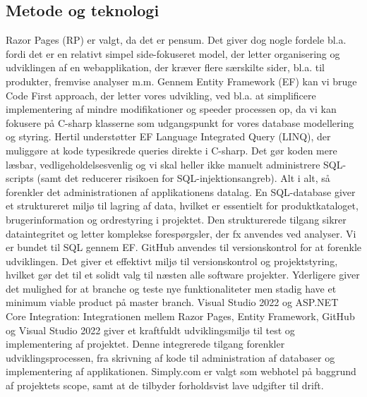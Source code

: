 \subsection{Metode og teknologi}
Razor Pages (RP) er valgt, da det er pensum. 
Det giver dog nogle fordele bl.a. fordi det er en relativt simpel side-fokuseret model, der letter organisering og udviklingen af en webapplikation, der kræver flere særskilte sider, bl.a. til produkter, fremvise analyser m.m. 
Gennem Entity Framework (EF) kan vi bruge Code First approach, der letter vores udvikling, ved bl.a. at simplificere implementering af mindre modifikationer og speeder processen op, 
da vi kan fokusere på C-sharp klasserne som udgangspunkt for vores database modellering og styring. Hertil understøtter EF Language Integrated Query (LINQ), der muliggøre at kode typesikrede queries direkte i C-sharp. 
Det gør koden mere læsbar, vedligeholdelsesvenlig og vi skal heller ikke manuelt administrere SQL-scripts (samt det reducerer risikoen for SQL-injektionsangreb). 
Alt i alt, så forenkler det administrationen af applikationens datalag. En SQL-database giver et struktureret miljø til lagring af data, hvilket er essentielt for produktkataloget, brugerinformation og ordrestyring i projektet. 
Den strukturerede tilgang sikrer dataintegritet og letter komplekse forespørgsler, der fx anvendes ved analyser. Vi er bundet til SQL gennem EF.
GitHub anvendes til versionskontrol for at forenkle udviklingen. Det giver et effektivt miljø til versionskontrol og projektstyring, hvilket gør det til et solidt valg til næsten alle software projekter. 
Yderligere giver det mulighed for at branche og teste nye funktionaliteter men stadig have et minimum viable product på master branch. 
Visual Studio 2022 og ASP.NET Core Integration: Integrationen mellem Razor Pages, Entity Framework, GitHub og Visual Studio 2022 giver et kraftfuldt udviklingsmiljø til test og implementering af projektet. 
Denne integrerede tilgang forenkler udviklingsprocessen, fra skrivning af kode til administration af databaser og implementering af applikationen.
Simply.com er valgt som webhotel på baggrund af projektets scope, samt at de tilbyder forholdsvist lave udgifter til drift.